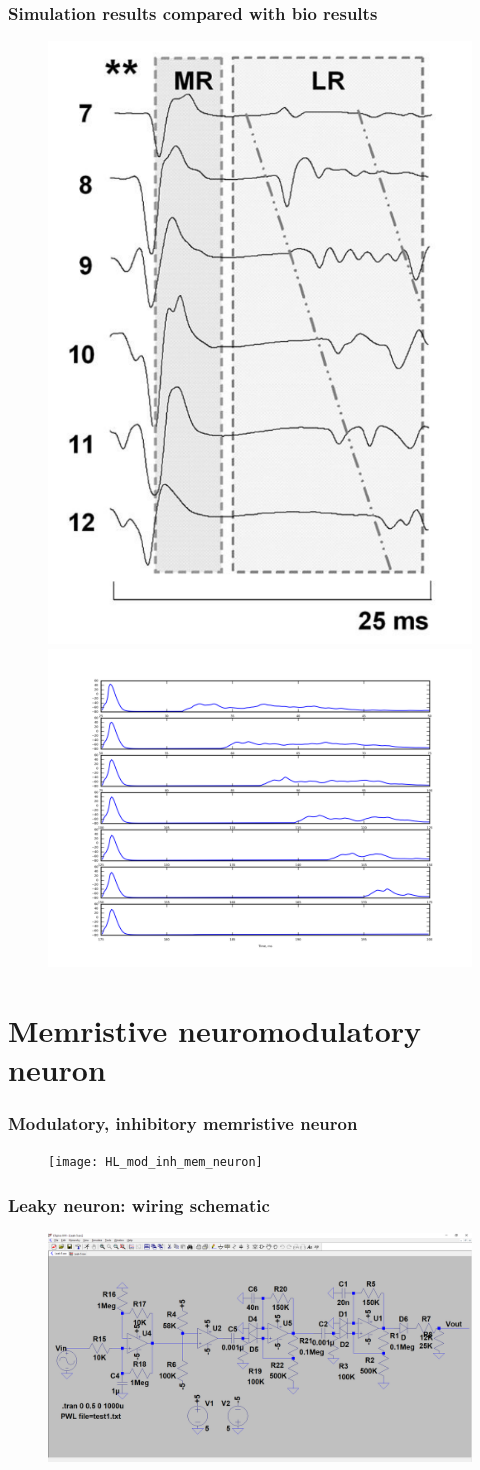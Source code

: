 \documentclass[12pt, aspectratio=169]{beamer}
\begin{document}
\begin{frame}
  \frametitle{Simulation results compared with bio results}
  \begin{figure}
    \includegraphics[width=0.2725\linewidth]{mscs_biological_results}
    \includegraphics[width=0.60\linewidth]{mscs_simulation_results}
  \end{figure}
\end{frame}

\section{Memristive neuromodulatory neuron}

\begin{frame}
  \frametitle{Modulatory, inhibitory memristive neuron}
  \begin{figure}
    \texttt{[image: HL\_mod\_inh\_mem\_neuron]}
  \end{figure}
\end{frame}


\begin{frame}
\frametitle{Leaky neuron: wiring schematic}
\begin{figure}
\includegraphics[width=0.85\linewidth]{Leak_sch}
\end{figure}
\end{frame}
\end{document}
